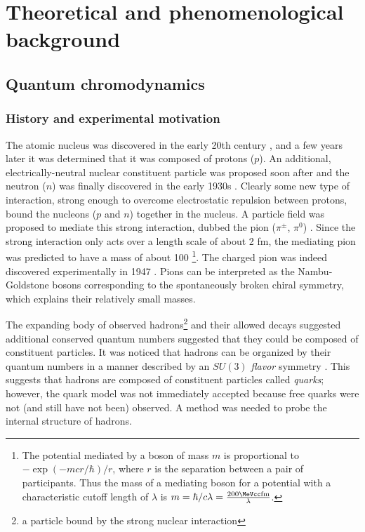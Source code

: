 \chapter{Theoretical and phenomenological background}
\label{ch:background}
\graphicspath{{Chapter-Background/figures/}}

\section{Quantum chromodynamics}
\subsection{History and experimental motivation}

The atomic nucleus was discovered in the early 20th century \cite{Rutherford:1911zz}, and a few years later it was determined that it was composed of protons ($p$).
An additional, electrically-neutral nuclear constituent particle was proposed soon after and the neutron ($n$) was finally discovered in the early 1930s \cite{Chadwick:1932ma}.
Clearly some new type of interaction, strong enough to overcome electrostatic repulsion between protons, bound the nucleons ($p$ and $n$) together in the nucleus.
A particle field was proposed to mediate this strong interaction, dubbed the pion ($\pi^\pm$, $\pi^0$) \cite{Yukawa:1935xg}.
Since the strong interaction only acts over a length scale of about 2 fm, the mediating pion was predicted to have a mass of about 100 \MeV\footnote{The potential mediated by a boson of mass $m$ is proportional to \( - \exp(-mcr/\hbar)/r\), where $r$ is the separation between a pair of participants. Thus the mass of a mediating boson for a potential with a characteristic cutoff length of $\lambda$ is $m = \hbar/c\lambda = \frac{200 \MeVcc \textrm{fm}}{\lambda}$.}.
The charged pion was indeed discovered experimentally in 1947 \cite{Lattes:1947mw}.
Pions can be interpreted as the Nambu-Goldstone bosons corresponding to the spontaneously broken chiral symmetry, which explains their relatively small masses.

The expanding body of observed hadrons\footnote{a particle bound by the strong nuclear interaction} and their allowed decays suggested additional conserved quantum numbers suggested that they could be composed of constituent particles.
It was noticed that hadrons can be organized by their quantum numbers in a manner described by an $SU(3)$ \emph{flavor} symmetry \cite{GellMann:1962xb}.
This suggests that hadrons are composed of constituent particles called \emph{quarks}; however, the quark model was not immediately accepted because free quarks were not (and still have not been) observed.
A method was needed to probe the internal structure of hadrons.

